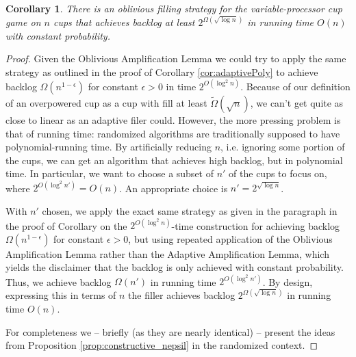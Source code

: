 \documentclass[twocolumn]{article}[10pt]
\newtheorem{corollary}{Corollary}
\begin{document}
\begin{corollary}
  \label{cor:obliviousPoly}
  There is an oblivious filling strategy for the variable-processor cup game on
  $n$ cups that achieves backlog at least $2^{\Omega(\sqrt{\log n})}$ in
  running time $O(n)$ with constant probability.
\end{corollary}
\begin{proof}
  Given the Oblivious Amplification Lemma we could try to apply the same
  strategy as outlined in the proof of Corollary \ref{cor:adaptivePoly} 
  to achieve backlog $\Omega(n^{1-\epsilon})$ for constant $\epsilon >0$ in time $2^{O(\log^2 n)}$.
  Because of our definition of an overpowered cup as a cup with fill at least
  $\tilde{\Omega}(\sqrt{n})$, we can't get quite as close to linear as an
  adaptive filer could. However, the more pressing problem is that of running
  time: randomized algorithms are traditionally supposed to have polynomial-running time.
  By artificially reducing $n$, i.e. ignoring some portion of the cups, we can
  get an algorithm that achieves high backlog, but in polynomial time.
  In particular, we want to choose a subset of $n'$ of the cups to focus on,
  where $2^{O(\log^2 n')} = O(n)$. An appropriate choice is $n' = 2^{\sqrt{\log n}}$.

  With $n'$ chosen, we apply the exact same strategy as given in the paragraph
  in the proof of Corollary on the $2^{O(\log^2 n)}$-time construction for
  achieving backlog $\Omega(n^{1-\epsilon})$ for constant $\epsilon >0$, but using
  repeated application of the Oblivious Amplification Lemma rather than the
  Adaptive Amplification Lemma, which yields the disclaimer that the backlog is
  only achieved with constant probability.
  Thus, we achieve backlog $\Omega(n')$ in running time $2^{O(\log^2
  n')}$. By design, expressing this in terms of $n$ the filler achieves 
  backlog $2^{\Omega(\sqrt{\log n})}$ in running time $O(n)$.

  For completeness we -- briefly (as they are nearly identical) -- present the
  ideas from Proposition \ref{prop:constructive_nepsil} in the randomized
  context.


\end{proof}
\end{document}
